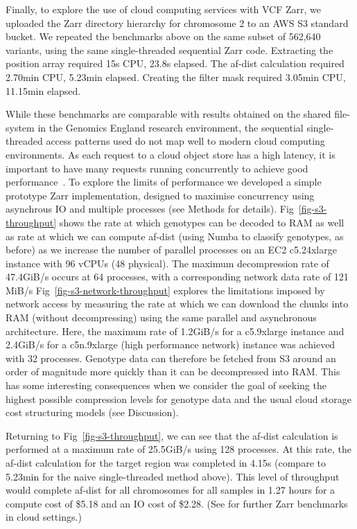 \documentclass[a4paper,num-refs]{oup-contemporary}
\begin{document}
Finally, to explore the use of cloud computing services with VCF Zarr,
we uploaded the Zarr directory hierarchy for chromosome 2 to an AWS S3 
standard bucket. We repeated the benchmarks above on the same subset
of 562,640 variants, using the same 
single-threaded sequential Zarr code.
Extracting the position array required 15s CPU, 23.8s elapsed.
The af-dist calculation required 2.70min CPU, 5.23min elapsed. 
Creating the filter mask
required 3.05min CPU, 11.15min elapsed. 

While these benchmarks are comparable with results obtained on the 
shared file-system in the Genomics England research environment,
the sequential single-threaded access patterns used do not map
well to modern cloud computing environments.
As each request to a cloud object store has a high latency, it 
is important to have many requests running concurrently to achieve 
good performance~\citep{durner2023exploiting}.
To explore the limits of performance we developed a simple prototype
Zarr implementation, designed to maximise concurrency using asynchrous
IO and multiple processes (see Methods for details).
Fig~\ref{fig-s3-throughput} shows the rate at which genotypes 
can be decoded to RAM as well as rate at which we can compute
af-dist (using Numba to classify genotypes, as before)
as we increase the number of parallel processes on
an EC2 c5.24xlarge instance with 96 vCPUs (48 physical).
The maximum decompression rate of 47.4GiB/s 
occurs at 64 processes, with a corresponding 
network data rate of 121 MiB/s
Fig~\ref{fig-s3-network-throughput} explores the limitations imposed by
network access by measuring the rate at which we can download the chunks
into RAM (without decompressing) using the same parallel and asynchronous
architecture. Here, the maximum rate of 1.2GiB/s for a c5.9xlarge instance
and 2.4GiB/s for a c5n.9xlarge (high performance network) instance
was achieved with 32 processes. Genotype data can therefore be fetched 
from S3 around an order of magnitude more quickly than it can be decompressed 
into RAM. This has some interesting consequences
when we consider the goal of seeking the highest possible compression levels 
for genotype data and the usual cloud storage cost structuring models (see
Discussion).

Returning to Fig~\ref{fig-s3-throughput}, we can see that the af-dist
calculation is performed at a maximum rate of 25.5GiB/s using 128 
processes. At this rate, the af-dist calculation for the target region 
was completed in 4.15s (compare to 5.23min for the naive single-threaded
method above).
This level of throughput would complete af-dist for all chromosomes for all samples
in 1.27 hours for a compute cost of \$5.18 and an IO cost of \$2.28.
(See \citep{durbin2020task,moore2021ome,gowan2022using} for further Zarr
benchmarks in cloud settings.)
\end{document}
